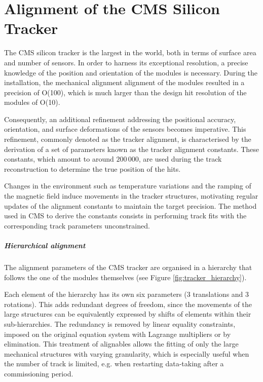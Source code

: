 \chapter{Alignment of the CMS Silicon Tracker}
\newcommand{\MPII}{\textsc{millepede}-II\xspace}
\newcommand{\HIPPY}{\textsc{HipPy}\xspace}
\newcommand{\MINRES}{\textsc{MinRes}\xspace}

The CMS silicon tracker is the largest in the world, both in terms of surface area and number of sensors.
In order to harness its exceptional resolution, a precise knowledge of the position and orientation of the modules is necessary.
During the installation, the mechanical alignment alignment of the modules resulted in a precision of O(100\mum),
which is much larger than the design hit resolution of the modules of O(10\mum).

Consequently, an additional refinement addressing the positional accuracy, orientation, and surface deformations of the sensors becomes imperative.
This refinement, commonly denoted as the tracker alignment, is characterised by the derivation of a set of parameters known as the tracker alignment constants.
These constants, which amount to around $200\,000$, are used during the track reconstruction to determine the true position of the hits.

Changes in the environment such as temperature variations and the ramping of the magnetic field induce movements in the tracker structures,
motivating regular updates of the alignment constants to maintain the target precision.
The method used in CMS to derive the constants consists in performing track fits with the corresponding track parameters unconstrained.

\paragraph{Hierarchical alignment\\}
The alignment parameters of the CMS tracker are organised in a hierarchy that follows the one of the modules themselves (see Figure \ref{fig:tracker_hierarchy}).

Each element of the hierarchy has its own six parameters (3 translations and 3 rotations).
This adds redundant degrees of freedom, since the movements of the large structures can be equivalently expressed by shifts of elements within their sub-hierarchies.
The redundancy is removed by linear equality constraints,
imposed on the original equation system with Lagrange multipliers
or by elimination.
This treatment of alignables allows the fitting of only the large mechanical structures with varying granularity,
which is especially useful when the number of track is limited, e.g. when restarting data-taking after a commissioning period.

